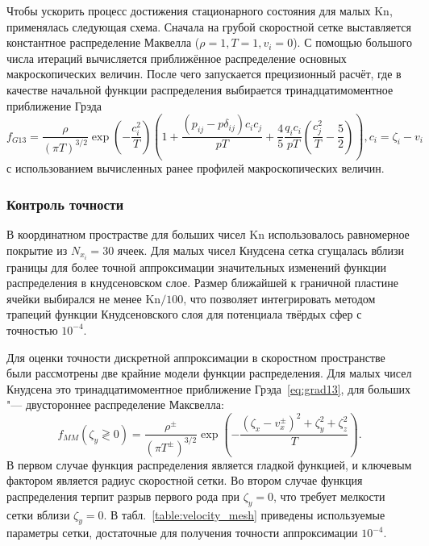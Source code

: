 \documentclass[a4paper,12pt]{article}
\newcommand{\Kn}{\mathrm{Kn}}
\begin{document}
Чтобы ускорить процесс достижения стационарного состояния для малых \(\Kn\), применялась следующая схема.
Сначала на грубой скоростной сетке выставляется константное распределение Маквелла (\(\rho=1,T=1,v_i=0\)).
С помощью большого числа итераций вычисляется приближённое распределение основных макроскопических величин.
После чего запускается прецизионный расчёт, где в качестве начальной функции распределения выбирается
тринадцатимоментное приближение Грэда~\cite{Grad1949}
\begin{equation}\label{eq:grad13}
    f_{G13} = \frac{\rho}{(\pi T)^{3/2}}\exp\left(-\frac{c_i^2}{ T}\right)
    \left( 1 + \frac{(p_{ij}-p\delta_{ij})c_ic_j}{pT} + \frac4{5}\frac{q_ic_i}{pT}\left(\frac{c_j^2}{T}-\frac5{2}\right) \right),
    c_i = \zeta_i - v_i
\end{equation}
с использованием вычисленных ранее профилей макроскопических величин.

\subsubsection{Контроль точности}

В координатном прострастве для больших чисел \(\Kn\) использовалось равномерное покрытие
из \(N_{x_i} = 30\) ячеек. Для малых чисел Кнудсена сетка сгущалась вблизи границы
для более точной аппроксимации значительных изменений функции распределения в кнудсеновском слое.
Размер ближайшей к граничной пластине ячейки выбирался не менее \(\Kn/100\),
что позволяет интегрировать методом трапеций функции Кнудсеновского слоя для потенциала твёрдых сфер
с точностью \(10^{-4}\).

Для оценки точности дискретной аппроксимации в скоростном пространстве были рассмотрены две крайние модели
функции распределения. Для малых чисел Кнудсена это тринадцатимоментное приближение Грэда~\eqref{eq:grad13},
для больших "--- двустороннее распределение Максвелла:
\begin{equation}\label{eq:double_Maxwell}
    f_{MM}(\zeta_y\gtrless0) = \frac{\rho^\pm}{(\pi T^\pm)^{3/2}}\exp\left(-\frac{(\zeta_x-v_x^\pm)^2+\zeta_y^2+\zeta_z^2}{T}\right).
\end{equation}
В первом случае функция распределения является гладкой функцией, и ключевым фактором является
радиус скоростной сетки. Во втором случае функция распределения терпит разрыв первого рода при \(\zeta_y=0\),
что требует мелкости сетки вблизи \(\zeta_y=0\).
В табл.~\ref{table:velocity_mesh} приведены используемые параметры сетки,
достаточные для получения точности аппроксимации \(10^{-4}\).
\end{document}
